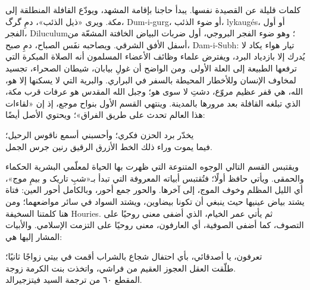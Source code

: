 

كلمات قليلة عن القصيدة نفسها. يبدأ حاجنا بإقامة المشهد، ويودّع القافلة المنطلقة إلى مكة. ويرى «ذيل الذئب»، دمِ گرگ، \textenglish{Dum-i-gurg}، أو ضوء الذئب، \textenglish{lykaugés}، أو أول الفجر، \textenglish{Diluculum}؛ وهو ضوء الفجر البروجي، أول ضربات البياض الخافتة المشعّة من أسفل الأفق الشرقي. ويصاحبه نفَس الصباح، دمِ صبح، \textenglish{Dam-i-Subh}: تيار هواء يكاد لا يُدرك إلا بازدياد البرد، ويفترض علماء وظائف الأعضاء المسلمون أنه الصلاة المبكرة التي ترفعها الطبيعة إلى العلة الأولى. ومن الواضح أن غولِ بيابان، شيطان الصحراء، تجسيد لمخاوف الإنسان وللأخطار المحيطة بالسفر في البراري. والبرية التي لا يسكنها إلا هو، الله، هي قفر عظيم مروّع، دشتِ لا سوى هو؛ وجبل الله المقدس هو عرفات قرب مكة، الذي تبلغه القافلة بعد مرورها بالمدينة. وينتهي القسم الأول بنواح موجع، إذ إن «لقاءات هذا العالم تحدث على طريق الفراق»؛ ويحتوي الأصل أيضًا:

\begin{SourceQuotation}
يخدّر برد الحزن فكري؛ وأحسبني أسمع ناقوس الرحيل؛\\
فيما يموت وراء ذلك الخط الأزرق الرقيق رنين جرس الجمل.
\end{SourceQuotation}

ويقتبس القسم التالي الوجوه المتنوعة التي ظهرت بها الحياة لمعلّمي البشرية الحكماء والحمقى. ويأتي حافظ أولًا؛ فتُقتبس أبياته المعروفة التي تبدأ بـ«شبِ تاریک و بیمِ موج»، أي الليل المظلم وخوف الموج، إلى آخرها. والحور جمع أحور، وبالكامل أحور العين: فتاة يشتد بياض عينيها حيث ينبغي أن تكونا بيضاوين، ويشتد السواد في سائر مواضعهما؛ ومن هنا كلمتنا السخيفة \textenglish{Houries}. ثم يأتي عمر الخيام، الذي أضفى معنى روحيًا على التصوف، كما أضفى الصوفية، أي العارفون، معنى روحيًا على التزمت الإسلامي. والأبيات المشار إليها هي:

\begin{SourceQuotation}
تعرفون، يا أصدقائي، بأي احتفال شجاع بالشراب أقمت في بيتي زواجًا ثانيًا؛\\
طلّقت العقل العجوز العقيم من فراشي، واتخذت بنت الكرمة زوجة.\\
المقطع ٦٠ من ترجمة السيد فيتزجيرالد.
\end{SourceQuotation}

